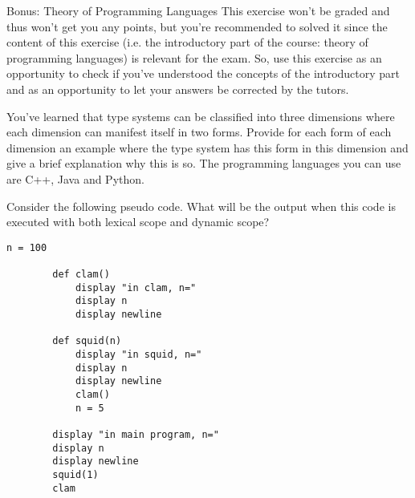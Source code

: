 \documentclass[12pt,a4paper]{scrartcl}
\begin{document}
\newpage

\begin{aufgabe}[0]{Bonus: Theory of Programming Languages}
This exercise won't be graded and thus won't get you any points, but you're recommended to solved it since the content of this exercise (i.e. the introductory part of the course: theory of programming languages) is relevant for the exam. So, use this exercise as an opportunity to check if you've understood the concepts of the introductory part and as an opportunity to let your answers be corrected by the tutors.

\begin{teilaufgabe}
    You've learned that type systems can be classified into three dimensions where each dimension can manifest itself in two forms.
    \newline
    \newline Provide for each form of each dimension an example where the type system has this form in this dimension and give a brief explanation why this is so. The programming languages you can use are C++, Java and Python.
\end{teilaufgabe}

\begin{teilaufgabe}
    Consider the following pseudo code. What will be the output when this code is executed with both lexical scope and dynamic scope?
    \begin{lstlisting}[gobble=8]
        n = 100

        def clam()
            display "in clam, n="
            display n
            display newline

        def squid(n)
            display "in squid, n="
            display n
            display newline
            clam()
            n = 5

        display "in main program, n="
        display n
        display newline
        squid(1)
        clam
    \end{lstlisting}
\end{teilaufgabe}

\end{aufgabe}
\end{document}
